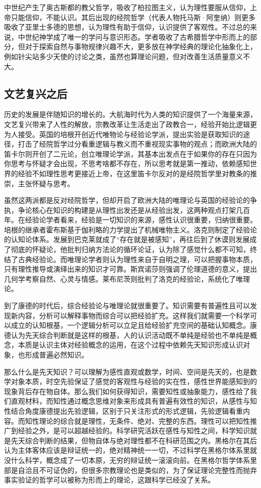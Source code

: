 \documentclass[]{tufte-book}
\begin{document}
中世纪产生了奥古斯都的教父哲学，吸收了柏拉图主义，认为理性要服从信仰，上帝只能信仰，不能认识。其后出现的经院哲学（代表人物托马斯·阿奎纳）则更多吸收了亚里士多德的思想，认为理性有助于信仰，认识提供了客观性。不过总的来说，中世纪神学成了唯一的学问与意识形态。学者吸收了古希腊哲学中形而上的部分，但对于探索自然与事物规律兴趣不大，更多放在神学经典的理论化抽象化上，例如针尖站多少天使的讨论之类，虽然也算理论问题，但对改善生活质量意义不大。

\hypertarget{ux6587ux827aux590dux5174ux4e4bux540e}{%
\subsection{文艺复兴之后}\label{ux6587ux827aux590dux5174ux4e4bux540e}}

历史的发展是伴随知识的增长的。大航海时代为人类的知识提供了一个海量来源，文艺复兴带来了人性的解放，宗教改革让生活走出了政教合一，经验开始比逻辑更为人接受。英国的培根开创近代唯物论与经验论学派，提出实验是获取知识的途径，打击了经院哲学过分看重逻辑与教义而不重视现实事物的观点；而欧洲大陆的笛卡尔则开创了二元论，创立唯理论学派，其基本出发点在于如果你的存在只因为你思考与怀疑才会出现，不思考啥都不存在，所以思考就是第一推动，依赖感知世界的经验不如理性思考更接近上帝，在这里笛卡尔反对的是经院哲学里对教条的推崇，主张怀疑与思考。

虽然这两派都是反对经院哲学，但却开启了欧洲大陆的唯理论与英国的经验论的争执，争论核心在知识的构建是从理性出发还是从经验出发，这两种观点打架几百年。在经验论学者看来，经验是一切知识的来源，感性认识很重要，归纳很重要。培根的继承者霍布斯基于伽利略的力学提出了机械唯物主义。洛克则制定了经验论的认知论体系。发展到巴克莱就成了``存在就是被感知''，再往后到了休谟则发展成了彻底的怀疑论，他批判归纳方法论的循环论证，认为除了感觉什么都不可知，终结了古典经验论。而唯理论学者则认为理性来自于自明之理，可以把握事物本质，只有理性推导或演绎出来的知识才可靠。斯宾诺莎则强调了伦理道德的意义，提出几何学考察自然、心灵与情感。莱布尼茨则批判了洛克的经验论，系统化了唯理论。

到了康德的时代后，综合经验论与唯理论就很重要了。知识需要有普遍性且可以发现新内容，分析可以解释事物而综合可以把经验扩充。这样我们就需要一个科学可以成立的认知根基，一个逻辑分析可以立足且给经验扩充空间的基础认知概念。康德认为先天综合判断就是这样的根基，人的认识活动既不单纯是经验也不单纯是概念，本质是认识主体对经验概念的运用，在这个过程中依赖先天知识形成认识对象，也形成普遍必然知识。

那么什么是先天知识？可以理解为感性直观或数学，时间、空间是先天的，也是数学对象本质，时空先验保证了感觉的客观性与经验的实在性，感性世界能感知到的现象背后存在物自体。那么我们如何获得知识，需要知性或抽象能力，感性给了我们直观材料，而知性通过概念思维对象来形成具有普遍有效性的知识，从感性与知性结合角度康德提出先验逻辑，区别于只关注形式的形式逻辑，先验逻辑看重内容。而知性理论的综合就是理性，无条件、绝对、完整的东西。理性可以把知性推广到经验之外，是可以超越经验的。科学研究活跃在感性与知性之间，科学知识就是先天综合判断的结果，但物自体与绝对理性都不在科研范围之内。黑格尔在其后认为主体客体应该是辩证统一的，绝对精神统一一切，不过科学在黑格尔体系里就没什么科学，概念成了一切本原，无穷的辩证统一滚滚向前。在黑格尔哲学体系里部是自洽且不可证伪的，但很多宗教理论也是类似的，为了保证理论完整性而抛弃事实验证的哲学可以被称为形而上的理论，这跟科学已经没了关系。
\end{document}
